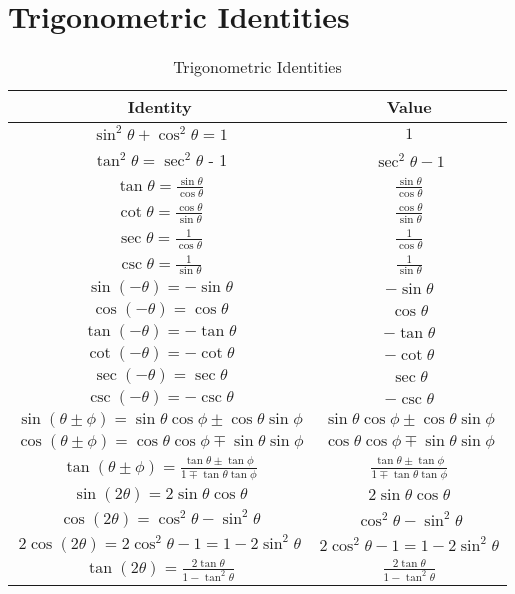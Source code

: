 \section{Trigonometric Identities}\label{app:trigIdentities}
\begin{table}
    \centering
    \begin{tabular}{|c|c|}
        \hline
        \textbf{Identity} & \textbf{Value} \\
        \hline
        $\sin^2\theta + \cos^2\theta = 1$ & $1$ \\
        $\tan^2\theta = \sec^2\theta$ - 1 & $\sec^2\theta - 1$ \\
        $\tan\theta = \frac{\sin\theta}{\cos\theta}$ & $\frac{\sin\theta}{\cos\theta}$ \\
        $\cot\theta = \frac{\cos\theta}{\sin\theta}$ & $\frac{\cos\theta}{\sin\theta}$ \\
        $\sec\theta = \frac{1}{\cos\theta}$ & $\frac{1}{\cos\theta}$ \\
        $\csc\theta = \frac{1}{\sin\theta}$ & $\frac{1}{\sin\theta}$ \\
        $\sin(-\theta) = -\sin\theta$ & $-\sin\theta$ \\
        $\cos(-\theta) = \cos\theta$ & $\cos\theta$ \\
        $\tan(-\theta) = -\tan\theta$ & $-\tan\theta$ \\
        $\cot(-\theta) = -\cot\theta$ & $-\cot\theta$ \\
        $\sec(-\theta) = \sec\theta$ & $\sec\theta$ \\
        $\csc(-\theta) = -\csc\theta$ & $-\csc\theta$ \\
        $\sin(\theta \pm \phi) = \sin\theta\cos\phi \pm \cos\theta\sin\phi$ & $\sin\theta\cos\phi \pm \cos\theta\sin\phi$ \\
        $\cos(\theta \pm \phi) = \cos\theta\cos\phi \mp \sin\theta\sin\phi$ & $\cos\theta\cos\phi \mp \sin\theta\sin\phi$ \\
        $\tan(\theta \pm \phi) = \frac{\tan\theta \pm \tan\phi}{1 \mp \tan\theta\tan\phi}$ & $\frac{\tan\theta \pm \tan\phi}{1 \mp \tan\theta\tan\phi}$ \\
        $\sin(2\theta) = 2\sin\theta\cos\theta$ & $2\sin\theta\cos\theta$ \\
        $\cos(2\theta) = \cos^2\theta - \sin^2\theta$ & $\cos^2\theta - \sin^2\theta$ \\
        $2\cos(2\theta) = 2\cos^2\theta - 1 = 1 - 2\sin^2\theta$ & $2\cos^2\theta - 1 = 1 - 2\sin^2\theta$ \\
        $\tan(2\theta) = \frac{2\tan\theta}{1 - \tan^2\theta}$ & $\frac{2\tan\theta}{1 - \tan^2\theta}$ \\
        \hline
    \end{tabular}
    \caption{Trigonometric Identities}
    \label{tab:trigIdentities}
\end{table}
